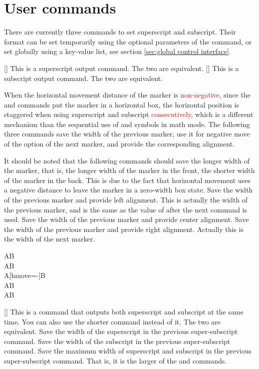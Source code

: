 \documentclass[load-preamble+]{cnltx-doc}
\renewcommand{\emph}[1]{\textcolor{red}{#1}}
\begin{document}
\section{User commands}
There are currently three commands to set superscript and subscript. Their format can be set temporarily using the optional parameters of the command, or set globally using a key-value list, see section \ref{sec:global control interface}.
\begin{commands}
  [\sarg{}]
  This is a superscript output command. The two  are equivalent.
  [\sarg{}]
  This is a subscript output command. The two  are equivalent.

  When the horizontal movement distance of the marker is \emph{non-negative}, since the  and  commands put the marker in a horizontal box, the horizontal position is staggered when using superscript and subscript \emph{consecutively}, which is a different mechanism than the sequential use of \code{\^{}} and \code{\_} symbols in math mode. The following three commands save the width of the previous marker, use it for negative move of the  option of the next marker, and provide the corresponding alignment.

  It should be noted that the following commands should save the longer width of the marker, that is, the longer width of the marker in the front, the shorter width of the marker in the back. This is due to the fact that horizontal movement uses a negative distance to leave the marker in a zero-width box state.
  \newtag%
  Save the width of the previous marker and provide left alignment. This is actually the width of the previous marker, and is the same as the value of  after the next command is used.
  \newtag%
  Save the width of the previous marker and provide center alignment. 
  \newtag%
  Save the width of the previous marker and provide right alignment. Actually this is the width of the next marker.
  \begin{example}
  AB \\
  AB \\
  A[hmove=-\llastwd]B \\
  AB \\
  AB \\
  \end{example}
  [\sarg{}]
  This is a command that outputs both superscript and subscript at the same time. You can also use the shorter command  instead of it. The two  are equivalent.
  Save the width of the superscript in the previous super-subscript command.
  Save the width of the subscript in the previous super-subscript command.
  Save the maximum width of superscript and subscript in the previous super-subscript command. That is, it is the larger of the  and  commands.


\end{commands}
\end{document}
